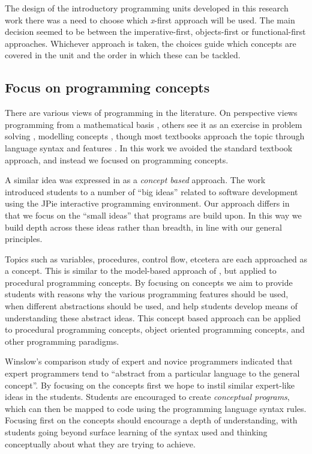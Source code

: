 The design of the introductory programming units developed in this research work there was a need to choose which \emph{x}-first approach will be used. The main decision seemed to be between the imperative-first, objects-first or functional-first approaches. Whichever approach is taken, the choices guide which concepts are covered in the unit and the order in which these can be tackled.


\subsection{Focus on programming concepts} %
\label{sub:focus_on_programming_concepts}

There are various views of programming in the literature. On perspective views programming from a mathematical basis \cite{Denning:1989,Dijkstra:1989,Hoare:1969}, others see it as an exercise in problem solving \cite{Palumbo:1990}, modelling concepts \cite{Bennedsen:2004}, though most textbooks approach the topic through language syntax and features \cite{Robins:2003}. In this work we avoided the standard textbook approach, and instead we focused on programming concepts.

A similar idea was expressed in \citet{Goldman:2004} as a \emph{concept based} approach. The work introduced students to a number of ``big ideas'' related to software development using the JPie interactive programming environment. Our approach differs in that we focus on the ``small ideas'' that programs are build upon. In this way we build depth across these ideas rather than breadth, in line with our general principles.

Topics such as variables, procedures, control flow, etcetera are each approached as a concept. This is similar to the model-based approach of \citet{Bennedsen:2004}, but applied to procedural programming concepts. By focusing on concepts we aim to provide students with reasons why the various programming features should be used, when different abstractions should be used, and help students develop means of understanding these abstract ideas. This concept based approach can be applied to procedural programming concepts, object oriented programming concepts, and other programming paradigms.

Winslow's comparison study of expert and novice programmers \cite{Winslow:1996} indicated that expert programmers tend to ``abstract from a particular language to the general concept''. By focusing on the concepts first we hope to instil similar expert-like ideas in the students. Students are encouraged to create \emph{conceptual programs}, which can then be mapped to code using the programming language syntax rules. Focusing first on the concepts should encourage a depth of understanding, with students going beyond surface learning of the syntax used and thinking conceptually about what they are trying to achieve.

